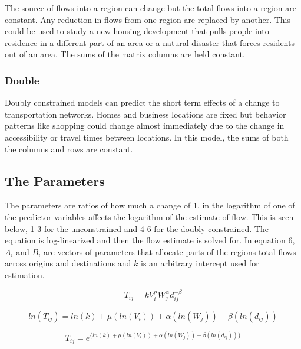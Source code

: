 \documentclass[11pt]{article} %
\begin{document}
The source of flows into a region can change but the total flows into a region are constant. Any reduction in flows from one region are replaced by another.  This could be used to study a new housing development that pulls people into residence in a different part of an area or a natural disaster that forces residents out of an area.  The sums of the matrix columns are held constant.

\subsubsection{Double}

Doubly constrained models can predict the short term effects of a change to transportation networks. Homes and business locations are fixed but behavior patterns like shopping could change almost immediately due to the change in accessibility or travel times between locations. In this model, the sums of both the columns and rows are constant.

\subsection{The Parameters}

The parameters are ratios of how much a change of 1, in the logarithm of one of the predictor variables affects the logarithm of the estimate of flow. This is seen below, 1-3 for the unconstrained and 4-6 for the doubly constrained. The equation is log-linearized and then the flow estimate is solved for. In equation 6, $A_i$ and $B_i$ are vectors of parameters that allocate parts of the regions total flows across origins and destinations and $k$ is an arbitrary intercept used for estimation. 

\begin{equation}
T_{ij} = k V_i ^{\mu} W_j^{\alpha} d_{ij}^{-\beta}
\end{equation}

\begin{equation}
ln(T_{ij}) = ln(k) + \mu (ln(V_i)) +  \alpha( ln(W_j)) - \beta (ln(d_{ij}))
\end{equation}




\begin{equation}
T_{ij} = e^ { \{ ln(k) + \mu (ln(V_i)) +  \alpha( ln(W_j)) - \beta (ln(d_{ij})) \}}
\end{equation}
\end{document}
